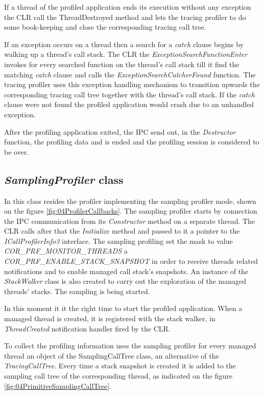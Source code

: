 If a thread of the profiled application ends its execution without any exception the CLR call the ThreadDestroyed method and lets the tracing profiler to do some book-keeping and close the corresponding tracing call tree.

If an exception occurs on a thread then a search for a \textit{catch} clause begins by walking up a thread's call stack. The CLR the \textit{ExceptionSearchFunctionEnter} invokes for every searched function on the thread's call stack till it find the matching \textit{catch} clause and calls the \textit{ExceptionSearchCatcherFound} function. The tracing profiler uses this exception handling mechanism to transition upwards the corresponding tracing call tree together with the thread's call stack. If the \textit{catch} clause were not found the profiled application would crash due to an unhandled exception.
 
After the profiling application exited, the IPC send out, in the \textit{Destructor} function, the profiling data and is ended and the profiling session is considered to be over.


\subsection{\textit{SamplingProfiler} class}
In this class resides the profiler implementing the sampling profiler mode, shown on the figure \ref{fig:04ProfilerCallbacks}. The sampling profiler starts by connection the IPC communication from its \textit{Constructor} method on a separate thread. The CLR calls after that the \textit{Initialize} method and passed to it a pointer to the \textit{ICallProfilerInfo3} interface. The sampling profiling set the mask to value \textit{COR\_PRF\_MONITOR\_THREADS} a \textit{COR\_PRF\_ENABLE\_STACK\_SNAPSHOT} in order to receive threads related notifications and to enable managed call stack's snapshots. An instance of the \textit{StackWalker} class is also created to carry out the exploration of the managed threads' stacks. The sampling is being started.

In this moment it it the right time to start the profiled application. When a managed thread is created, it is registered with the stack walker, in \textit{ThreadCreated} notification handler fired by the CLR.

To collect the profiling information uses the sampling profiler for every managed thread an object of the SamplingCallTree class, an alternative of the \textit{TracingCallTree}. Every time a stack snapshot is created it is added to the sampling call tree of the corresponding thread, as indicated on the figure \ref{fig:04PrimitiveSamplingCallTree}. 

